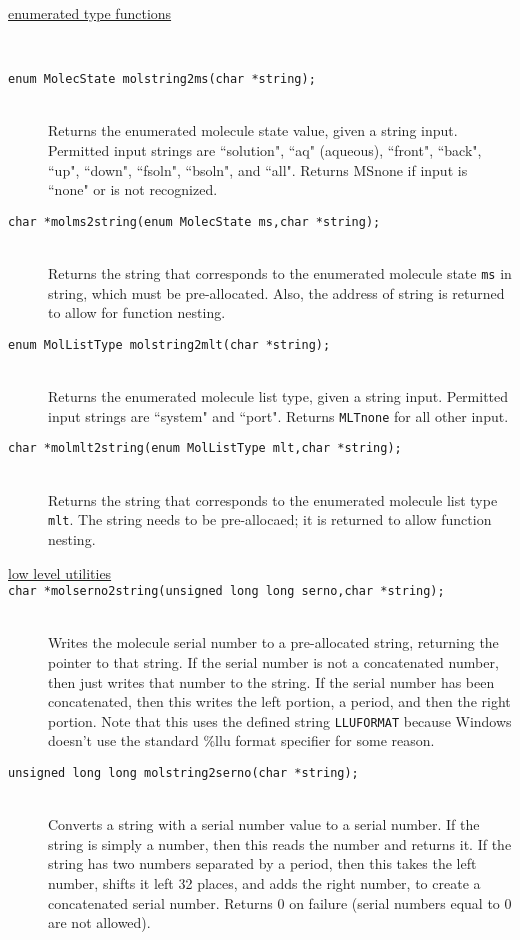 \documentclass {scrbook}
\newcommand {\ttt} {\texttt}
\begin{document}
\begin{description}

\item[\underline{enumerated type functions}]
\hfill \\

\item[\ttt{enum MolecState molstring2ms(char *string);}]
\hfill \\
Returns the enumerated molecule state value, given a string input. Permitted input strings are ``solution", ``aq" (aqueous), ``front", ``back", ``up", ``down", ``fsoln", ``bsoln", and ``all". Returns MSnone if input is ``none" or is not recognized.

\item[\ttt{char *molms2string(enum MolecState ms,char *string);}]
\hfill \\
Returns the string that corresponds to the enumerated molecule state \ttt{ms} in string, which must be pre-allocated. Also, the address of string is returned to allow for function nesting.

\item[\ttt{enum MolListType molstring2mlt(char *string);}]
\hfill \\
Returns the enumerated molecule list type, given a string input. Permitted input strings are ``system" and ``port". Returns \ttt{MLTnone} for all other input.

\item[\ttt{char *molmlt2string(enum MolListType mlt,char *string);}]
\hfill \\
Returns the string that corresponds to the enumerated molecule list type \ttt{mlt}. The string needs to be pre-allocaed; it is returned to allow function nesting.

\item[\underline{low level utilities}]

\item[\ttt{char *molserno2string(unsigned long long serno,char *string);}]
\hfill \\
Writes the molecule serial number to a pre-allocated string, returning the pointer to that string. If the serial number is not a concatenated number, then just writes that number to the string. If the serial number has been concatenated, then this writes the left portion, a period, and then the right portion. Note that this uses the defined string \ttt{LLUFORMAT} because Windows doesn't use the standard \%llu format specifier for some reason.

\item[\ttt{unsigned long long molstring2serno(char *string);}]
\hfill \\
Converts a string with a serial number value to a serial number. If the string is simply a number, then this reads the number and returns it. If the string has two numbers separated by a period, then this takes the left number, shifts it left 32 places, and adds the right number, to create a concatenated serial number. Returns 0 on failure (serial numbers equal to 0 are not allowed).


\end{description}
\end{document}

